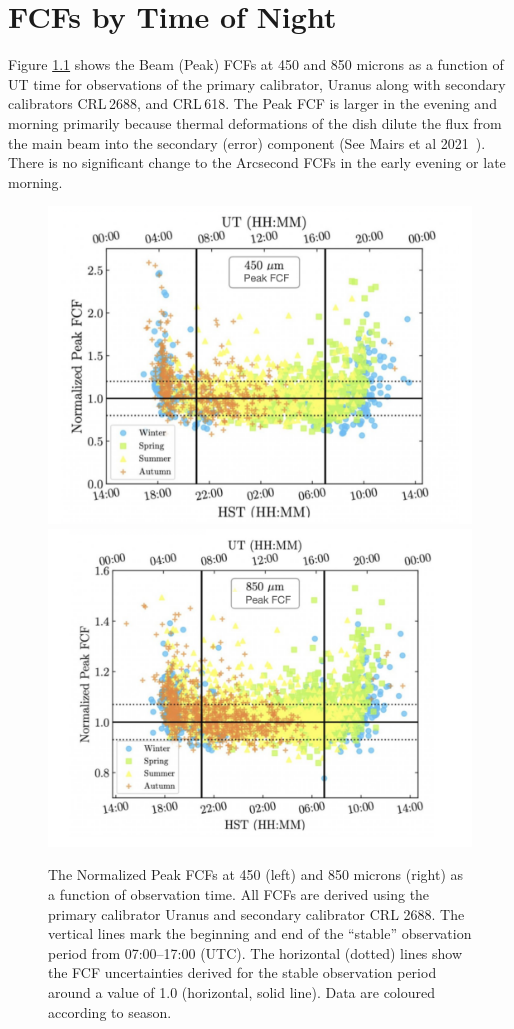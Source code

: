 \chapter{FCFs by Time of Night}
\label{app:fcfstime}

Figure \ref{fig:FCFsTimeOfNight} shows the Beam (Peak) FCFs at 
450 and 850 microns as a function of UT time for observations of the
primary calibrator, Uranus along with secondary calibrators CRL\,2688, and CRL\,618.
The Peak FCF is larger in the evening and morning primarily because thermal 
deformations of the dish dilute the flux from the main beam into the secondary 
(error) component (See Mairs et al 2021~\cite{mairs21}). There is no significant 
change to the Arcsecond FCFs in the early evening or late morning.

\begin{figure}
\begin{center}
\includegraphics[width=0.47\linewidth]{sc21-FCFsTimeOfNight-450} \hspace{0.02\linewidth}
\includegraphics[width=0.47\linewidth]{sc21-FCFsTimeOfNight-850}
\caption[FCFs Time of Night]{The Normalized Peak FCFs at 450 (left) and 850 microns (right) 
as a function of observation time. All FCFs are derived using the primary calibrator Uranus and 
secondary calibrator CRL 2688. The vertical lines mark the beginning and end of the “stable” observation 
period from 07:00–17:00 (UTC). The horizontal (dotted) lines show the FCF uncertainties derived for the 
stable observation period around a value of 1.0 (horizontal, solid line). 
Data are coloured according to season. \label{fig:FCFsTimeOfNight}}
\end{center}
\end{figure}

